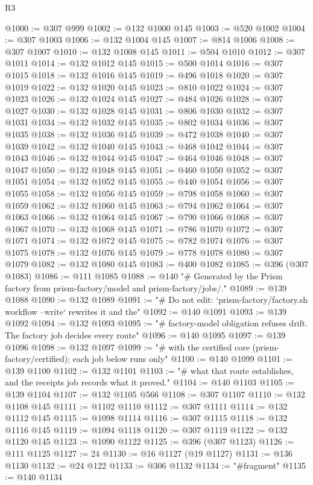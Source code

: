 \begin{lexlean}{R3}
\begin{coremodule}
@1000 := @307 @999
@1002 := @132 @1000 @145
@1003 := @520 @1002
@1004 := @307 @1003
@1006 := @132 @1004 @145
@1007 := @814 @1006
@1008 := @307 @1007
@1010 := @132 @1008 @145
@1011 := @504 @1010
@1012 := @307 @1011
@1014 := @132 @1012 @145
@1015 := @500 @1014
@1016 := @307 @1015
@1018 := @132 @1016 @145
@1019 := @496 @1018
@1020 := @307 @1019
@1022 := @132 @1020 @145
@1023 := @810 @1022
@1024 := @307 @1023
@1026 := @132 @1024 @145
@1027 := @484 @1026
@1028 := @307 @1027
@1030 := @132 @1028 @145
@1031 := @806 @1030
@1032 := @307 @1031
@1034 := @132 @1032 @145
@1035 := @802 @1034
@1036 := @307 @1035
@1038 := @132 @1036 @145
@1039 := @472 @1038
@1040 := @307 @1039
@1042 := @132 @1040 @145
@1043 := @468 @1042
@1044 := @307 @1043
@1046 := @132 @1044 @145
@1047 := @464 @1046
@1048 := @307 @1047
@1050 := @132 @1048 @145
@1051 := @460 @1050
@1052 := @307 @1051
@1054 := @132 @1052 @145
@1055 := @440 @1054
@1056 := @307 @1055
@1058 := @132 @1056 @145
@1059 := @798 @1058
@1060 := @307 @1059
@1062 := @132 @1060 @145
@1063 := @794 @1062
@1064 := @307 @1063
@1066 := @132 @1064 @145
@1067 := @790 @1066
@1068 := @307 @1067
@1070 := @132 @1068 @145
@1071 := @786 @1070
@1072 := @307 @1071
@1074 := @132 @1072 @145
@1075 := @782 @1074
@1076 := @307 @1075
@1078 := @132 @1076 @145
@1079 := @778 @1078
@1080 := @307 @1079
@1082 := @132 @1080 @145
@1083 := @400 @1082
@1085 := @396 (@307 @1083)
@1086 := @111 @1085
@1088 := @140 "# Generated by the Prism factory from prism-factory/model and prism-factory/jobs/."
@1089 := @139 @1088
@1090 := @132 @1089
@1091 := "# Do not edit: `prism-factory/factory.sh workflow --write` rewrites it and the"
@1092 := @140 @1091
@1093 := @139 @1092
@1094 := @132 @1093
@1095 := "# factory-model obligation refuses drift. The factory job decides every route"
@1096 := @140 @1095
@1097 := @139 @1096
@1098 := @132 @1097
@1099 := "# with the certified core (prism-factory/certified); each job below runs only"
@1100 := @140 @1099
@1101 := @139 @1100
@1102 := @132 @1101
@1103 := "# what that route establishes, and the receipts job records what it proved."
@1104 := @140 @1103
@1105 := @139 @1104
@1107 := @132 @1105 @566
@1108 := @307 @1107
@1110 := @132 @1108 @145
@1111 := @1102 @1110
@1112 := @307 @1111
@1114 := @132 @1112 @145
@1115 := @1098 @1114
@1116 := @307 @1115
@1118 := @132 @1116 @145
@1119 := @1094 @1118
@1120 := @307 @1119
@1122 := @132 @1120 @145
@1123 := @1090 @1122
@1125 := @396 (@307 @1123)
@1126 := @111 @1125
@1127 := 24
@1130 := @16 @1127 (@19 @1127)
@1131 := @136 @1130
@1132 := @24 @122
@1133 := @306 @1132
@1134 := "#fragment"
@1135 := @140 @1134

\end{coremodule}
\end{lexlean}
